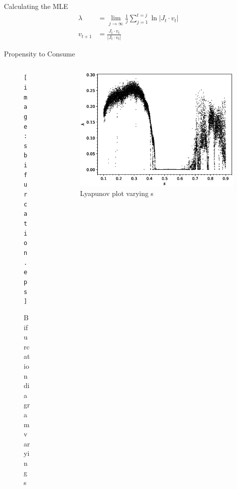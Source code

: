 \documentclass{beamer}
\begin{document}
\begin{frame}{Calculating the MLE}
	\begin{align*}
		\lambda &= \lim_{j\to\infty}\frac{1}{j}\sum^{t=j}_{j=1}\ln|J_t\cdot v_t|\\
		v_{t+1} &=\frac{J_t\cdot v_t}{|J_t\cdot v_t|}
	\end{align*}
\end{frame}
\begin{frame}{Propensity to Consume}
	\begin{columns}
	\begin{column}{0.5\textwidth}
		\begin{figure}
			\centering
			\texttt{[image: sbifurcation.eps]}
			\caption{Bifurcation diagram varying s}
		\end{figure}
	\end{column}
	\begin{column}{0.5\textwidth}
		\begin{figure}
			\centering
			\includegraphics[width=1.2\textwidth]{slyplot.eps}
			\caption{Lyapunov plot varying s}
		\end{figure}
	\end{column}
	\end{columns}
\end{frame}
\end{document}
